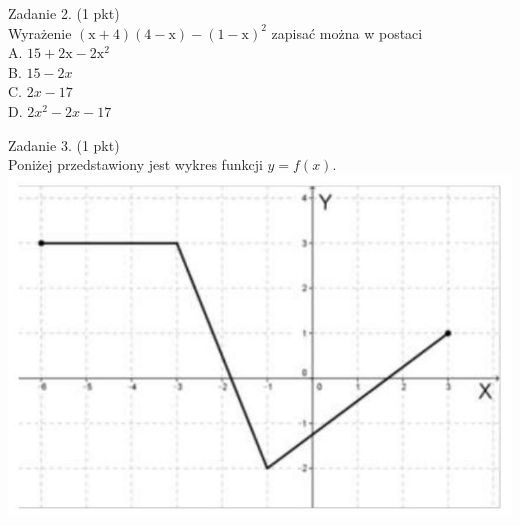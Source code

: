 \documentclass[10pt]{article}
\begin{document}
Zadanie 2. (1 pkt)\\
Wyrażenie \((\mathrm{x}+4)(4-\mathrm{x})-(1-\mathrm{x})^{2}\) zapisać można w postaci\\
A. \(15+2 \mathrm{x}-2 \mathrm{x}^{2}\)\\
B. \(15-2 x\)\\
C. \(2 x-17\)\\
D. \(2 x^{2}-2 x-17\)

Zadanie 3. (1 pkt)\\
Poniżej przedstawiony jest wykres funkcji \(y=f(x)\).\\
\includegraphics[max width=\textwidth, center]{2024_11_21_8e981e1ab2c7e641f462g-02(3)}
\end{document}
